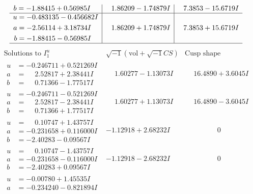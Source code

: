 \documentclass[1p]{elsarticle_modified}
\theoremstyle{definition}
\newcommand{\I}{\sqrt{-1}}
\begin{document}
$$\begin{array}{c|c|c}
\begin{aligned}
b &= -1.88415 + 0.56985 I\end{aligned}
 & \phantom{-}1.86209 - 1.74879 I & \phantom{-}7.3853 - 15.6719 I \\ \hline\begin{aligned}
u &= -0.483135 - 0.456682 I \\
a &= -2.56114 + 3.18734 I \\
b &= -1.88415 - 0.56985 I\end{aligned}
 & \phantom{-}1.86209 + 1.74879 I & \phantom{-}7.3853 + 15.6719 I\\
 \hline 
 \end{array}$$\newpage$$\begin{array}{c|c|c}  
\text{Solutions to }I^u_{1}& \I (\text{vol} + \sqrt{-1}CS) & \text{Cusp shape}\\
 \hline 
\begin{aligned}
u &= -0.246711 + 0.521269 I \\
a &= \phantom{-}2.52817 + 2.38441 I \\
b &= \phantom{-}0.71366 - 1.77517 I\end{aligned}
 & \phantom{-}1.60277 - 1.13073 I & \phantom{-}16.4890 + 3.6045 I \\ \hline\begin{aligned}
u &= -0.246711 - 0.521269 I \\
a &= \phantom{-}2.52817 - 2.38441 I \\
b &= \phantom{-}0.71366 + 1.77517 I\end{aligned}
 & \phantom{-}1.60277 + 1.13073 I & \phantom{-}16.4890 - 3.6045 I \\ \hline\begin{aligned}
u &= \phantom{-}0.10747 + 1.43757 I \\
a &= -0.231658 + 0.116000 I \\
b &= -2.40283 - 0.09567 I\end{aligned}
 & -1.12918 + 2.68232 I & \phantom{-0.000000 } 0 \\ \hline\begin{aligned}
u &= \phantom{-}0.10747 - 1.43757 I \\
a &= -0.231658 - 0.116000 I \\
b &= -2.40283 + 0.09567 I\end{aligned}
 & -1.12918 - 2.68232 I & \phantom{-0.000000 } 0 \\ \hline\begin{aligned}
u &= -0.00780 + 1.45535 I \\
a &= -0.234240 - 0.821894 I \\

\end{aligned}
\end{array}$$
\end{document}
